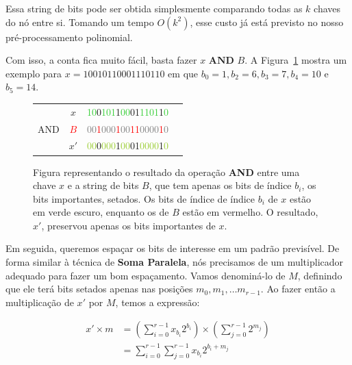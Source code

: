 Essa string de bits pode ser obtida simplesmente comparando todas as $k$ chaves
do nó entre si. Tomando um tempo $O(k^2)$, esse custo já está previsto no nosso
pré-processamento polinomial.

Com isso, a conta fica muito fácil, basta fazer $x \textbf{ AND } B$. A
Figura~\ref{f:fusion-approx-sketch-and} mostra um exemplo para
$x=10010110001110110$ em que $b_0=1,b_2=6,b_3=7,b_4=10$ e $b_5=14$.

\begin{figure}[h]
\centering
{
\bfseries\Large
\begin{tabular}{cccc}
& \textcolor{PineGreen}{$x$} &
\textcolor{LimeGreen}{10}\textcolor{PineGreen}{0}\textcolor{LimeGreen}{101}\textcolor{PineGreen}{1}\textcolor{LimeGreen}{00}\textcolor{PineGreen}{01}\textcolor{LimeGreen}{1101}\textcolor{PineGreen}{1}\textcolor{LimeGreen}{0}   \\
AND & \textcolor{Red}{$B$} &
\textcolor{Gray}{00}\textcolor{Red}{1}\textcolor{Gray}{000}\textcolor{Red}{1}\textcolor{Gray}{00}\textcolor{Red}{11}\textcolor{Gray}{0000}\textcolor{Red}{1}\textcolor{Gray}{0}  \\
      \hline
& \textcolor{PineGreen}{$x'$} &
\textcolor{YellowGreen}{00}\textcolor{PineGreen}{0}\textcolor{YellowGreen}{000}\textcolor{PineGreen}{1}\textcolor{YellowGreen}{00}\textcolor{PineGreen}{01}\textcolor{YellowGreen}{0000}\textcolor{PineGreen}{1}\textcolor{YellowGreen}{0}
\end{tabular}
} \caption{Figura representando o resultado da operação \textbf{AND} entre uma
chave $x$ e a string de bits $B$, que tem apenas os bits de índice $b_i$, os
bits importantes, setados. Os bits de índice de índice $b_i$ de $x$ estão em
verde escuro, enquanto os de $B$ estão em vermelho. O resultado, $x'$, preservou
apenas os bits importantes de $x$.\label{f:fusion-approx-sketch-and}}
\end{figure}

Em seguida, queremos espaçar os bits de interesse em um padrão previsível. De
forma similar à técnica de \textbf{Soma Paralela}, nós precisamos de um
multiplicador adequado para fazer um bom espaçamento. Vamos denominá-lo de $M$,
definindo que ele terá bits setados apenas nas posições $m_0,m_1,\dots m_{r-1}$.
Ao fazer então a multiplicação de $x'$ por $M$, temos a expressão:

\begin{align}
x' \times m & = \left( \sum_{i=0}^{r-1} x_{b_i}2^{b_i} \right) \times \left( \sum_{j=0}^{r-1}2^{m_j} \right) \\
              & =  \sum_{i=0}^{r-1}\sum_{j=0}^{r-1} x_{b_i}2^{b_i+m_j} 
\end{align}


